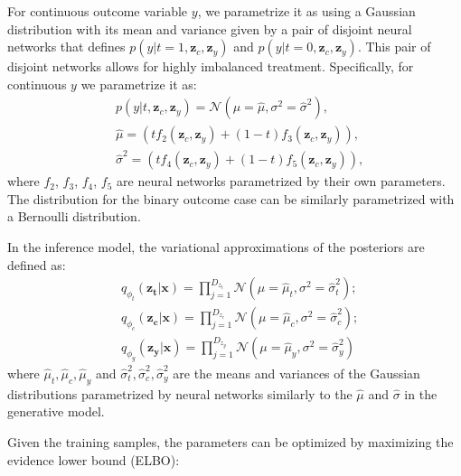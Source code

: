 \documentclass[letterpaper]{article} %
\begin{document}
For continuous outcome variable $y$, we parametrize it as using a Gaussian distribution with its mean and variance given by a pair of disjoint neural networks that defines $p(y|t=1,\mathbf{z}_c, \mathbf{z}_y)$ and $p(y|t=0,\mathbf{z}_c, \mathbf{z}_y)$. This pair of disjoint networks allows for highly imbalanced treatment. Specifically, for continuous $y$ we parametrize it as:
\begin{align}
&p(y|t, \mathbf{z}_c, \mathbf{z}_y)  = \mathcal{N}(\mu =\hat{\mu}, \sigma^2 = \hat{\sigma}^2),\nonumber\\
&\hat{\mu} = (tf_2(\mathbf{z}_c, \mathbf{z}_y) + (1-t)f_3(\mathbf{z}_c, \mathbf{z}_y)), \nonumber\\
&\hat{\sigma}^2 = (tf_4(\mathbf{z}_c, \mathbf{z}_y) + (1-t)f_5(\mathbf{z}_c, \mathbf{z}_y)),
\end{align}
where $f_2$, $f_3$, $f_4$, $f_5$ are neural networks parametrized by their own parameters.
The distribution for the binary outcome case can be similarly parametrized with a Bernoulli distribution. 

In the inference model, the variational approximations of the posteriors are defined as:
\begin{align}
&q_{\phi_{t}}(\mathbf{z_t}|\mathbf{x}) = \prod\limits_{j=1}^{D_{z_t}} \mathcal{N}(\mu = \hat{\mu}_{t}, \sigma^2 = \hat{\sigma}_t^2 );\nonumber\\
&q_{\phi_{c}}(\mathbf{z_c}|\mathbf{x}) = \prod\limits_{j=1}^{D_{z_c}} \mathcal{N} (\mu = \hat{\mu}_{c}, \sigma^2 = \hat{\sigma}_c^2 );\nonumber\\
&q_{\phi_{y}}(\mathbf{z_y}|\mathbf{x}) = \prod\limits_{j=1}^{D_{z_y}} \mathcal{N} (\mu = \hat{\mu}_{y}, \sigma^2 = \hat{\sigma}_y^2 )  
\end{align}
where $\hat{\mu}_t, \hat{\mu}_c, \hat{\mu}_y$ and $ \hat{\sigma}_t^2,  \hat{\sigma}_c^2,  \hat{\sigma}_y^2$ are the means and variances of the Gaussian distributions parametrized by neural networks similarly to the $\hat{\mu}$ and $\hat{\sigma}$ in the generative model. 

Given the training samples, the parameters can be optimized by maximizing the evidence lower bound (ELBO):
\end{document}
